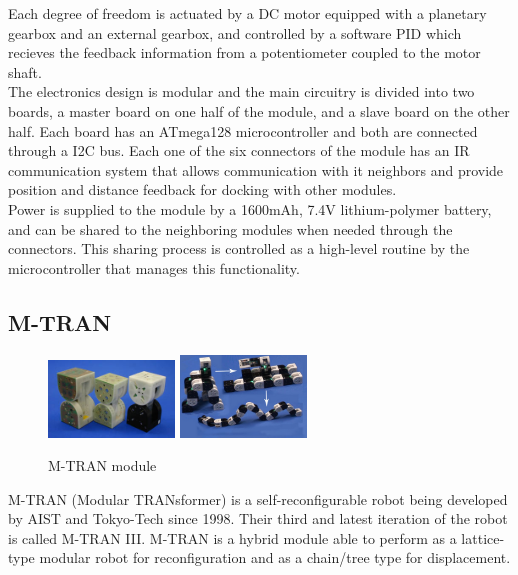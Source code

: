 Each degree of freedom is actuated by a DC motor equipped with a planetary gearbox and an external gearbox, and controlled by a software PID which recieves the feedback information from a potentiometer coupled to the motor shaft.
\\

The electronics design is modular and the main circuitry is divided into two boards, a master board on one half of the module, and a slave board on the other half. Each board has an ATmega128 microcontroller and both are connected through a I2C bus. Each one of the six connectors of the module has an IR communication system that allows communication with it neighbors and provide position and distance feedback for docking with other modules. 
\\

Power is supplied to the module by a 1600mAh, 7.4V lithium-polymer battery, and can be shared to the neighboring modules when needed through the connectors. This sharing process is controlled as a high-level routine by the microcontroller that manages this functionality.
\\

\subsection{M-TRAN}
\label{state_modules_M-TRAN}

\begin{figure}[t]
	\centering
	\includegraphics[width=0.3\textwidth]{images/M-TRAN01.jpg}
	\includegraphics[width=0.3\textwidth]{images/M-TRAN02.jpg}
	\caption{M-TRAN module}\label{fig:m-tran}
\end{figure}

M-TRAN (Modular TRANsformer) \cite{murata_m-tran:_2002,kurokawa_m-tran_2003,kurokawa_distributed_2008} is a self-reconfigurable robot being developed by AIST and Tokyo-Tech since 1998. Their third and latest iteration of the robot is called M-TRAN III. M-TRAN is a hybrid module able to perform as a lattice-type modular robot for reconfiguration and as a chain/tree type for displacement.
\\

